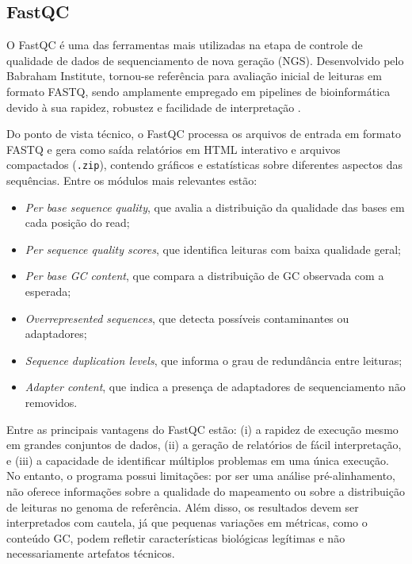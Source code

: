 \subsection{FastQC}

O FastQC é uma das ferramentas mais utilizadas na etapa de controle de qualidade de dados de sequenciamento de nova geração (NGS). Desenvolvido pelo Babraham Institute, tornou-se referência para avaliação inicial de leituras em formato FASTQ, sendo amplamente empregado em pipelines de bioinformática devido à sua rapidez, robustez e facilidade de interpretação \cite{andrews2010}.

Do ponto de vista técnico, o FastQC processa os arquivos de entrada em formato FASTQ e gera como saída relatórios em HTML interativo e arquivos compactados (\texttt{.zip}), contendo gráficos e estatísticas sobre diferentes aspectos das sequências. Entre os módulos mais relevantes estão:

\begin{itemize}
    \item \textit{Per base sequence quality}, que avalia a distribuição da qualidade das bases em cada posição do read;
    \item \textit{Per sequence quality scores}, que identifica leituras com baixa qualidade geral;
    \item \textit{Per base GC content}, que compara a distribuição de GC observada com a esperada;
    \item \textit{Overrepresented sequences}, que detecta possíveis contaminantes ou adaptadores;
    \item \textit{Sequence duplication levels}, que informa o grau de redundância entre leituras;
    \item \textit{Adapter content}, que indica a presença de adaptadores de sequenciamento não removidos.
\end{itemize}

Entre as principais vantagens do FastQC estão: (i) a rapidez de execução mesmo em grandes conjuntos de dados, (ii) a geração de relatórios de fácil interpretação, e (iii) a capacidade de identificar múltiplos problemas em uma única execução. No entanto, o programa possui limitações: por ser uma análise pré-alinhamento, não oferece informações sobre a qualidade do mapeamento ou sobre a distribuição de leituras no genoma de referência. Além disso, os resultados devem ser interpretados com cautela, já que pequenas variações em métricas, como o conteúdo GC, podem refletir características biológicas legítimas e não necessariamente artefatos técnicos.


